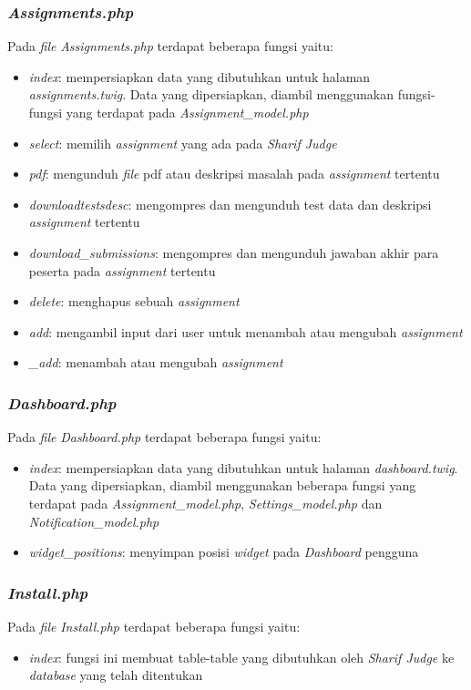 \subsubsection{\textit{Assignments.php}}
Pada \textit{file} \textit{Assignments.php} terdapat beberapa fungsi yaitu:
\begin{itemize}
	\item \textit{index}: mempersiapkan data yang dibutuhkan untuk halaman \textit{assignments.twig}. Data yang dipersiapkan, diambil menggunakan fungsi-fungsi yang terdapat pada \textit{Assignment\_model.php}
	\item \textit{select}: memilih \textit{assignment} yang ada pada \textit{Sharif Judge}
	\item \textit{pdf}: mengunduh \textit{file} pdf atau deskripsi masalah pada \textit{assignment} tertentu
	\item \textit{downloadtestsdesc}: mengompres dan mengunduh test data dan deskripsi \textit{assignment} tertentu
	\item \textit{download\_submissions}: mengompres dan mengunduh jawaban akhir para peserta pada \textit{assignment} tertentu
	\item \textit{delete}: menghapus sebuah \textit{assignment}
	\item \textit{add}: mengambil input dari user untuk menambah atau mengubah \textit{assignment}
	\item \textit{\_add}: menambah atau mengubah \textit{assignment}
\end{itemize}

\subsubsection{\textit{Dashboard.php}}
Pada \textit{file} \textit{Dashboard.php} terdapat beberapa fungsi yaitu:
\begin{itemize}
	\item \textit{index}: mempersiapkan data yang dibutuhkan untuk halaman \textit{dashboard.twig}. Data yang dipersiapkan, diambil menggunakan beberapa fungsi yang terdapat pada \textit{Assignment\_model.php}, \textit{Settings\_model.php} dan \textit{Notification\_model.php}
	\item \textit{widget\_positions}: menyimpan posisi \textit{widget} pada \textit{Dashboard} pengguna
\end{itemize}

\subsubsection{\textit{Install.php}}
Pada \textit{file} \textit{Install.php} terdapat beberapa fungsi yaitu:
\begin{itemize}
	\item \textit{index}: fungsi ini membuat table-table yang dibutuhkan oleh \textit{Sharif Judge} ke \textit{database} yang telah ditentukan
\end{itemize}

